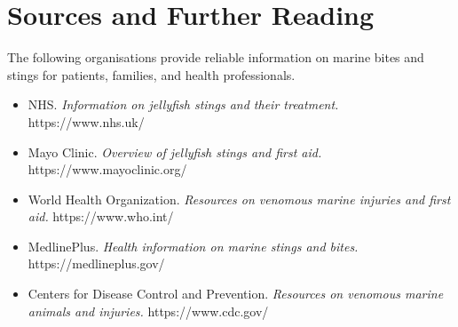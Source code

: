 \section*{Sources and Further Reading}
The following organisations provide reliable information on marine bites and stings for patients, families, and health professionals.

\begin{itemize}
    \item NHS. \textit{Information on jellyfish stings and their treatment.} https://www.nhs.uk/
    \item Mayo Clinic. \textit{Overview of jellyfish stings and first aid.} https://www.mayoclinic.org/
    \item World Health Organization. \textit{Resources on venomous marine injuries and first aid.} https://www.who.int/
    \item MedlinePlus. \textit{Health information on marine stings and bites.} https://medlineplus.gov/
    \item Centers for Disease Control and Prevention. \textit{Resources on venomous marine animals and injuries.} https://www.cdc.gov/
\end{itemize}
